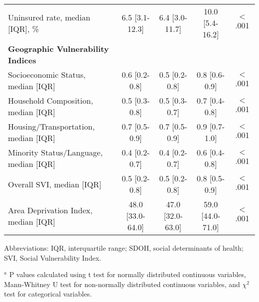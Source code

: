 \begin{table}[htbp]
\begin{tabular}{lcccc}
\quad Uninsured rate, median [IQR], \% & 6.5 [3.1-12.3] & 6.4 [3.0-11.7] & 10.0 [5.4-16.2] & $<$.001 \\
\textbf{Geographic Vulnerability Indices} &  &  &  &  \\
\addlinespace
\quad Socioeconomic Status, median [IQR] & 0.6 [0.2-0.8] & 0.5 [0.2-0.8] & 0.8 [0.6-0.9] & $<$.001 \\
\quad Household Composition, median [IQR] & 0.5 [0.3-0.8] & 0.5 [0.3-0.7] & 0.7 [0.4-0.8] & $<$.001 \\
\quad Housing/Transportation, median [IQR] & 0.7 [0.5-0.9] & 0.7 [0.5-0.9] & 0.9 [0.7-1.0] & $<$.001 \\
\quad Minority Status/Language, median [IQR] & 0.4 [0.2-0.7] & 0.4 [0.2-0.7] & 0.6 [0.4-0.8] & $<$.001 \\
\quad Overall SVI, median [IQR] & 0.5 [0.2-0.8] & 0.5 [0.2-0.8] & 0.8 [0.5-0.9] & $<$.001 \\
\quad Area Deprivation Index, median [IQR] & 48.0 [33.0-64.0] & 47.0 [32.0-63.0] & 59.0 [44.0-71.0] & $<$.001 \\
\bottomrule
\end{tabular}
\begin{tablenotes}
\small
\item Abbreviations: IQR, interquartile range; SDOH, social determinants of health; SVI, Social Vulnerability Index.
\item $^a$ P values calculated using t test for normally distributed continuous variables, Mann-Whitney U test for non-normally distributed continuous variables, and $\chi^2$ test for categorical variables.
\end{tablenotes}
\end{table}

